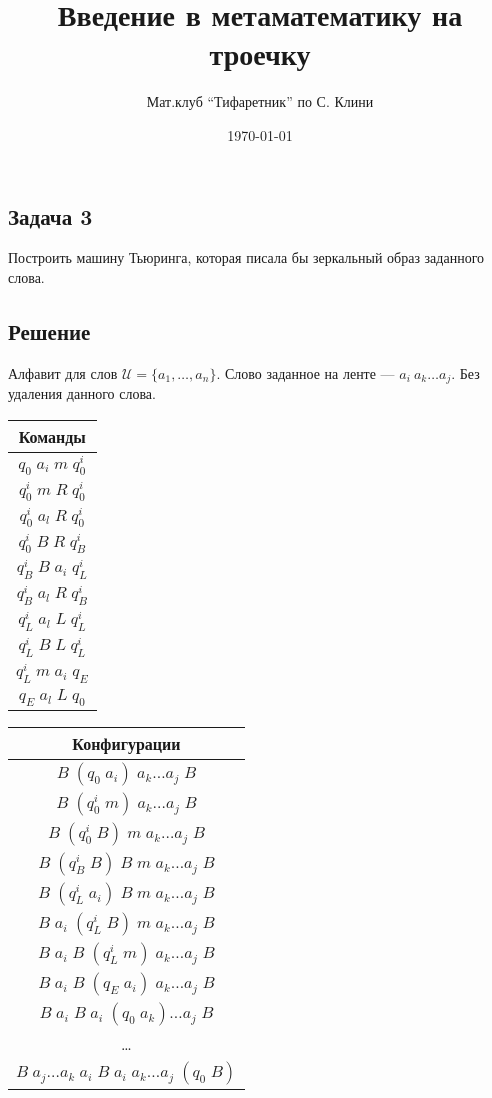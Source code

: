 \documentclass[a4paper, 12pt]{article}  %
\author{Мат.клуб ``Тифаретник'' по С. Клини}
\title{Введение в метаматематику на троечку}
\date{\today}
\theoremstyle{definition}
\begin{document}
	
	\subsection*{Задача 3}
	
	Построить машину Тьюринга, которая писала бы зеркальный образ заданного слова. 
	
	\subsection*{Решение}
	
	Алфавит для слов $\mathscr{U} = \{a_1, \dots, a_n\}$. Слово заданное на ленте --- 
	$a_i \: a_k \dots a_j$. Без удаления данного слова. 
	
	\begin{multicols}{4}
			
		\begin{tabular}{ | c |  }
			\hline
			Команды \\ 
			\hline
			$q_0 \; a_i \; m \; q_0^i$  \\
			\hline
			$q_0^i \; m \; R \; q_0^i$  \\
			$q_0^i \; a_l \; R \; q_0^i$  \\
			$q_0^i \; B \; R \; q_B^i$  \\
			\hline
			$q_B^i \; B \; a_i \; q_L^i$ \\
			$q_B^i \; a_l \; R \; q_B^i$ \\
			\hline
			$q_L^i \; a_l \; L \; q_L^i$ \\				
			$q_L^i \; B \; L \; q_L^i$  \\
			$q_L^i \; m \; a_i \; q_E$  \\
			\hline
			$q_E \; a_l \; L \; q_0$  \\
			\hline
		\end{tabular}
		
		\begin{tabular}{ | c | }
			\hline
			Конфигурации \\ 
			\hline
			$B \; (q_0 \; a_i) \; a_k \dots a_j \; B$  \\
			$B \; (q_0^i \; m) \; a_k \dots a_j \; B$   \\
			$B \; (q_0^i \; B) \; m \; a_k \dots a_j \; B$   \\
			$B \; (q_B^i \; B )\; B \; m \; a_k \dots a_j \; B$  \\
			$B \; (q_L^i \; a_i) \; B \; m \; a_k \dots a_j \; B$ \\
			$B  \; a_i \; (q_L^i \; B) \; m \; a_k \dots a_j \; B$  \\
			$B  \; a_i  \; B \; (q_L^i \; m) \; a_k \dots a_j \; B$  \\
			$B  \; a_i  \; B \; (q_E \; a_i) \; a_k \dots a_j \; B$   \\
			$B  \; a_i  \; B  \; a_i \; (q_0 \; a_k) \dots a_j \; B$  \\
			\dots \\
			$B  \; a_j \dots a_k \; a_i  \; B  \; a_i  \; a_k \dots a_j \; (q_0 \; B)$  \\
			\hline
		\end{tabular}
	\end{multicols}
\end{document}
